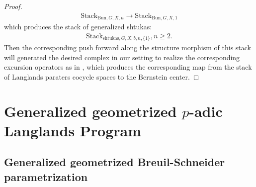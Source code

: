 \documentclass[12pt]{article}
\theoremstyle{definition}
\begin{document}
\begin{proof}
\begin{align}
\mathrm{Stack}_{\mathrm{Bun},G,X,n} \rightarrow \mathrm{Stack}_{\mathrm{Bun},G,X,1}
\end{align}
which produces the stack of generalized shtukas:
\begin{align}
\mathrm{Stack}_{\mathrm{shtukas},G,X,b,n,\{1\}}, n\geq 2.
\end{align}
Then the corresponding push forward along the structure morphism of this stack will generated the desired complex in our setting to realize the corresponding excursion operators as in \cite{FS}, which produces the corresponding map from the stack of Langlands paraters cocycle spaces to the Bernstein center.
\end{proof}


\newpage
\section{Generalized geometrized $p$-adic Langlands Program}

\subsection{Generalized geometrized Breuil-Schneider parametrization}
\end{document}
